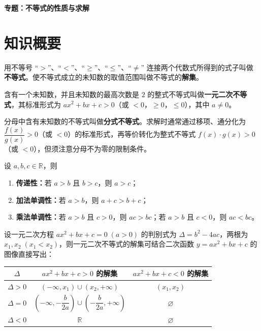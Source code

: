 \documentclass[11pt]{ctexrep}
\begin{document}
\begin{center}
    {\Large\bfseries 专题：不等式的性质与求解}
\end{center}

\section*{知识概要}

\begin{definition}[不等式]
用不等号 ``$>$''、``$<$''、``$\geq$''、``$\leq$''、``$\neq$'' 连接两个代数式所得到的式子叫做\textbf{不等式}。使不等式成立的未知数的取值范围叫做不等式的\textbf{解集}。
\end{definition}

\begin{definition}[一元二次不等式]
含有一个未知数，并且未知数的最高次数是 $2$ 的整式不等式叫做\textbf{一元二次不等式}，其标准形式为 $ax^2+bx+c>0$（或 $<0$，$\geq 0$，$\leq 0$），其中 $a\neq 0$。
\end{definition}

\begin{definition}[分式不等式]
分母中含有未知数的不等式叫做\textbf{分式不等式}。求解时通常通过移项、通分化为 $\dfrac{f(x)}{g(x)}>0$（或 $<0$）的标准形式，再等价转化为整式不等式 $f(x)\cdot g(x)>0$（或 $<0$），但须注意分母不为零的限制条件。
\end{definition}

\begin{property}[不等式的基本性质]
设 $a,b,c\in\mathbb{R}$，则
\begin{enumerate}[label=(\arabic*)]
    \item \textbf{传递性：}若 $a>b$ 且 $b>c$，则 $a>c$；
    \item \textbf{加法单调性：}若 $a>b$，则 $a+c>b+c$；
    \item \textbf{乘法单调性：}若 $a>b$ 且 $c>0$，则 $ac>bc$；若 $a>b$ 且 $c<0$，则 $ac<bc$。
\end{enumerate}
\end{property}

\begin{property}
设一元二次方程 $ax^2+bx+c=0\;(a>0)$ 的判别式为 $\Delta=b^2-4ac$，两根为 $x_1,x_2\;(x_1<x_2)$，则一元二次不等式的解集可结合二次函数 $y=ax^2+bx+c$ 的图像直接写出：
\begin{center}
\begin{tabular}{c|c|c}
\hline
$\Delta$ & $ax^2+bx+c>0$ 的解集 & $ax^2+bx+c<0$ 的解集 \\
\hline
$\Delta>0$ & $(-\infty,x_1)\cup(x_2,+\infty)$ & $(x_1,x_2)$ \\
$\Delta=0$ & $\left(-\infty,-\dfrac{b}{2a}\right)\cup\left(-\dfrac{b}{2a},+\infty\right)$ & $\varnothing$ \\
$\Delta<0$ & $\mathbb{R}$ & $\varnothing$ \\
\hline
\end{tabular}
\end{center}
\end{property}
\end{document}
